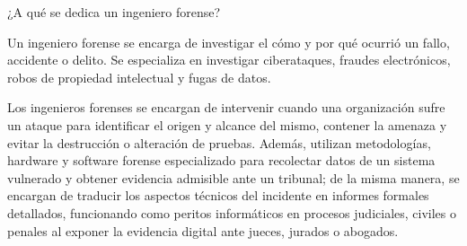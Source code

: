 ¿A qué se dedica un ingeniero forense?

Un ingeniero forense se encarga de investigar el cómo y por qué ocurrió un fallo, accidente o delito. Se especializa en investigar ciberataques, fraudes electrónicos, robos de propiedad intelectual y fugas de datos.

Los ingenieros forenses se encargan de intervenir cuando una organización sufre un ataque para identificar el origen y alcance del mismo, contener la amenaza y evitar la destrucción o alteración de pruebas. Además, utilizan metodologías, hardware y software forense especializado para recolectar datos de un sistema vulnerado y obtener evidencia admisible ante un tribunal; de la misma manera, se encargan de traducir los aspectos técnicos del incidente en informes formales detallados, funcionando como peritos informáticos en procesos judiciales, civiles o penales al exponer la evidencia digital ante jueces, jurados o abogados.
